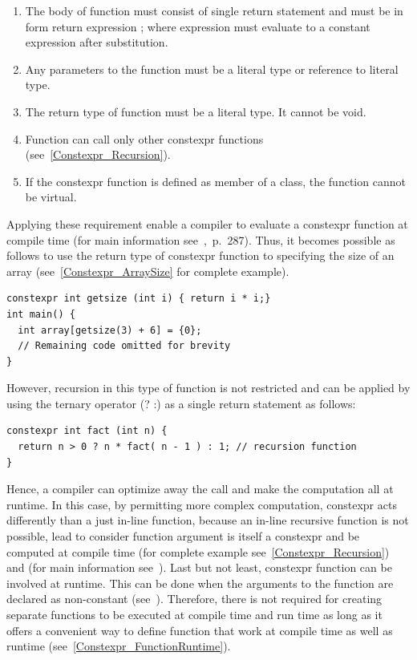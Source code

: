 \documentclass[11pt]{report}
\begin{document}
\begin{enumerate}
\item The body of function must consist of single return statement and must be in form {return expression ;} where expression must evaluate to a constant expression after substitution.

\item Any parameters to the function must be a literal type or reference to literal type.

\item The return type of function must be a literal type. It cannot be void.

\item Function can call only other constexpr functions (see~\ref{Constexpr_Recursion}).

\item If the constexpr function is defined as member of a class, the function cannot be virtual.
\end{enumerate}
Applying these requirement enable a compiler to evaluate a constexpr function at compile time (for main information see~\cite{Gregorie:professionalcpp},~p.~287). Thus, it becomes possible as follows to use the return type of constexpr function to specifying the size of an array (see~\ref{Constexpr_ArraySize} for complete example).
\begin{lstlisting}
constexpr int getsize (int i) { return i * i;}
int main() {
  int array[getsize(3) + 6] = {0};
  // Remaining code omitted for brevity
}
\end{lstlisting}
However, recursion in this type of function is not restricted and can be applied by using the ternary operator (? :) as a single return statement as follows:
\begin{lstlisting}
constexpr int fact (int n) {
  return n > 0 ? n * fact( n - 1 ) : 1; // recursion function
}
\end{lstlisting}
Hence, a compiler can optimize away the call and make the computation all at runtime. In this case, by permitting more complex computation, constexpr acts differently than a just in-line function, because an in-line recursive function is not possible, lead to consider function argument is itself a constexpr and be computed at compile time (for complete example see~\ref{Constexpr_Recursion}) and (for main information see~\cite{Allain:2011:FutureCpp}). Last but not least, constexpr function can be involved at runtime. This can be done when the arguments to the function are declared as non-constant (see~\cite{Allain:2011:FutureCpp}). Therefore, there is not required for creating separate functions to be executed at compile time and run time as long as it offers a convenient way to define function that work at compile time as well as runtime (see~\ref{Constexpr_FunctionRuntime}).
\end{document}
